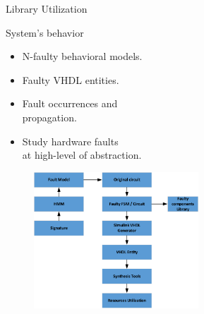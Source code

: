 \documentclass[aspectratio=1610]{beamer}
\begin{document}
\begin{frame}{Library Utilization}

\begin{block}{System's behavior}

\end{block}

\begin{itemize}
\item N-faulty behavioral models.
\item Faulty VHDL entities.

\item Fault occurrences and \\ propagation.
\item Study hardware faults  \\ at high-level of abstraction.

\vspace{-3.0cm}
\end{itemize}
\begin{figure}[tb!]
 \centering
  \captionsetup{justification=centering}    
   \includegraphics[width=0.55\textwidth, right]{Figures/library.pdf}
\label{fig:library1}
\end{figure}


\end{frame}
\end{document}
